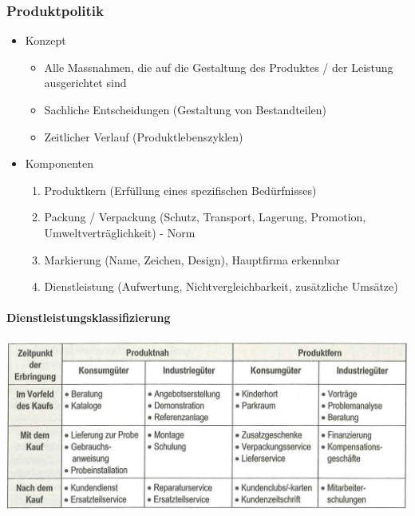 \subsubsection{Produktpolitik}
\begin{itemize}
	\item Konzept
	\begin{itemize}
		\item Alle Massnahmen, die auf die Gestaltung des Produktes / der Leistung ausgerichtet sind
		\item Sachliche Entscheidungen (Gestaltung von Bestandteilen)
		\item Zeitlicher Verlauf (Produktlebenszyklen)
	\end{itemize}
	\item Komponenten
	\begin{enumerate}
		\item Produktkern (Erfüllung eines spezifischen Bedürfnisses)
		\item Packung / Verpackung (Schutz, Transport, Lagerung, Promotion,	Umweltverträglichkeit) - Norm
		\item Markierung (Name, Zeichen, Design), Hauptfirma erkennbar
		\item Dienstleistung (Aufwertung, Nichtvergleichbarkeit, zusätzliche Umsätze)
	\end{enumerate}
\end{itemize}

\paragraph{Dienstleistungsklassifizierung}
\includegraphics[width=0.8\linewidth]{images/produktpolitik}

